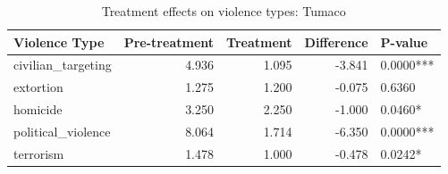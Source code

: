 \begin{table}

\caption{\label{tab:tab:treatment_tumaco}Treatment effects on violence types: Tumaco}
\centering
\begin{tabular}[t]{lrrrl}
\toprule
Violence Type & Pre-treatment & Treatment & Difference & P-value\\
\midrule
civilian\_targeting & 4.936 & 1.095 & -3.841 & 0.0000***\\
extortion & 1.275 & 1.200 & -0.075 & 0.6360\\
homicide & 3.250 & 2.250 & -1.000 & 0.0460*\\
political\_violence & 8.064 & 1.714 & -6.350 & 0.0000***\\
terrorism & 1.478 & 1.000 & -0.478 & 0.0242*\\
\bottomrule
\end{tabular}
\end{table}
